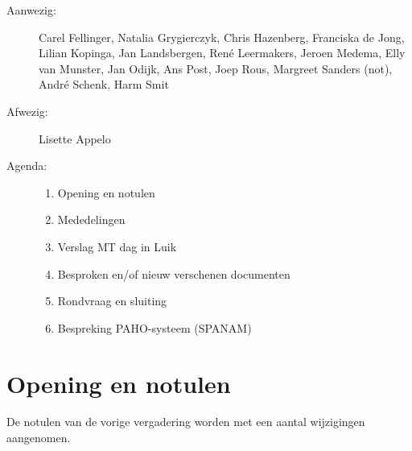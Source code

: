 

   \RosSupersedes{-}
   \MakeRosTitle
%
%
\begin{description}
\item[Aanwezig:] Carel Fellinger, Natalia Grygierczyk,
                 Chris Hazenberg, Franciska de Jong, 
                 Lilian Kopinga, Jan Landsbergen, Ren\'{e} Leermakers, 
                 Jeroen Medema, Elly van Munster, 
                 Jan Odijk, Ans Post, Joep Rous, Margreet Sanders (not),
                 Andr\'{e} Schenk, 
                 Harm Smit 
\item[Afwezig:]  Lisette Appelo
\item[Agenda:]\mbox{}
  \begin{enumerate}
  \item Opening en notulen
  \item Mededelingen
  \item Verslag MT dag in Luik
  \item Besproken en/of nieuw verschenen documenten
  \item Rondvraag en sluiting
  \item Bespreking PAHO-systeem (SPANAM)
  \end{enumerate}
\end{description}

\section{Opening en notulen}
De notulen van de vorige vergadering worden met een aantal wijzigingen 
aangenomen. 

